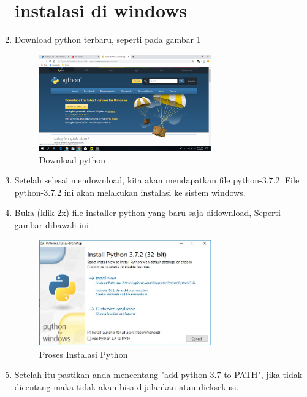 \begin{enumerate}
	
\section{instalasi di windows}
	
\item   Download python terbaru, seperti pada gambar \ref{Download}
\begin{figure}[ht]
	\centerline{\includegraphics[width=0.70\textwidth]{figures/download_python.PNG}}
	\caption{Download python}
	\label{Download}
\end{figure}
	

\item	Setelah selesai mendownload, kita akan mendapatkan file python-3.7.2. File python-3.7.2 ini akan melakukan instalasi ke sistem windows.
\item   Buka (klik 2x) file installer python yang baru saja didownload, Seperti gambar dibawah ini :
\begin{figure}[ht]
	\centerline{\includegraphics[width=0.70\textwidth]{figures/InstalasiPython.JPG}}
	\caption{Proses Instalasi Python}
	\label{Instalasi}
\end{figure}

\item   Setelah itu pastikan anda mencentang "add python 3.7 to PATH", jika tidak dicentang maka tidak akan bisa dijalankan atau dieksekusi.


\end{enumerate}
